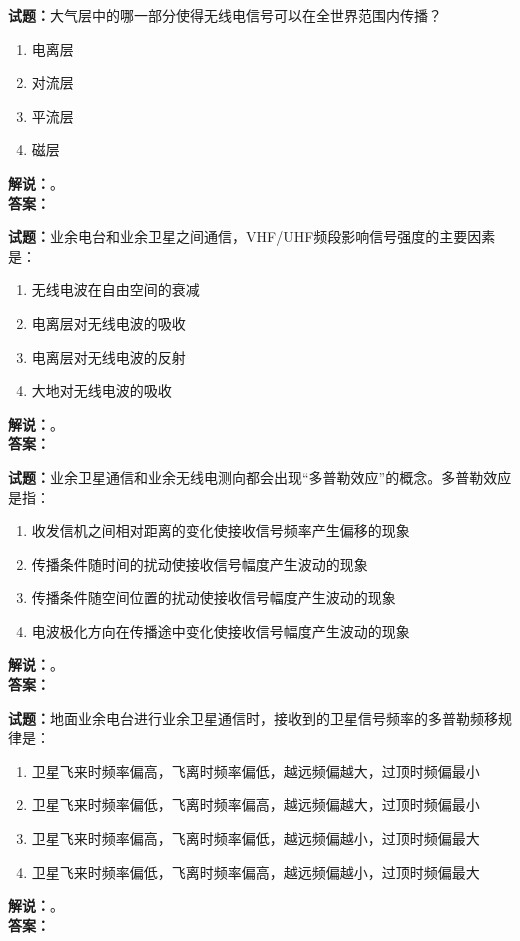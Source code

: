 \documentclass{ctexbook}
\begin{document}
\bigskip




\noindent\textbf{试题：}大气层中的哪一部分使得无线电信号可以在全世界范围内传播？
\begin{enumerate}[leftmargin=3em]
\item 电离层
\item 对流层
\item 平流层
\item 磁层
\end{enumerate}
\noindent\textbf{解说：}\textbf{}。\\\noindent\textbf{答案：}

\bigskip




\noindent\textbf{试题：}业余电台和业余卫星之间通信，VHF/UHF频段影响信号强度的主要因素是：
\begin{enumerate}[leftmargin=3em]
\item 无线电波在自由空间的衰减
\item 电离层对无线电波的吸收
\item 电离层对无线电波的反射
\item 大地对无线电波的吸收
\end{enumerate}
\noindent\textbf{解说：}\textbf{}。\\\noindent\textbf{答案：}

\bigskip




\noindent\textbf{试题：}业余卫星通信和业余无线电测向都会出现“多普勒效应”的概念。多普勒效应是指：
\begin{enumerate}[leftmargin=3em]
\item 收发信机之间相对距离的变化使接收信号频率产生偏移的现象
\item 传播条件随时间的扰动使接收信号幅度产生波动的现象
\item 传播条件随空间位置的扰动使接收信号幅度产生波动的现象
\item 电波极化方向在传播途中变化使接收信号幅度产生波动的现象
\end{enumerate}
\noindent\textbf{解说：}\textbf{}。\\\noindent\textbf{答案：}

\bigskip




\noindent\textbf{试题：}地面业余电台进行业余卫星通信时，接收到的卫星信号频率的多普勒频移规律是：
\begin{enumerate}[leftmargin=3em]
\item 卫星飞来时频率偏高，飞离时频率偏低，越远频偏越大，过顶时频偏最小
\item 卫星飞来时频率偏低，飞离时频率偏高，越远频偏越大，过顶时频偏最小
\item 卫星飞来时频率偏高，飞离时频率偏低，越远频偏越小，过顶时频偏最大
\item 卫星飞来时频率偏低，飞离时频率偏高，越远频偏越小，过顶时频偏最大
\end{enumerate}
\noindent\textbf{解说：}\textbf{}。\\\noindent\textbf{答案：}
\end{document}
